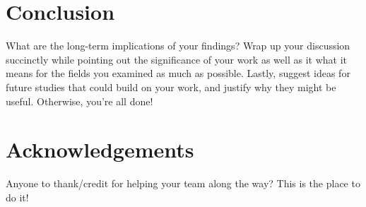 \documentclass[10pt,twocolumn,letterpaper]{article}
\begin{document}
\section{Conclusion}
What are the long-term implications of your findings? Wrap up your discussion succinctly while pointing out the significance of your work as well as it what it means for the fields you examined as much as possible. Lastly, suggest ideas for future studies that could build on your work, and justify why they might be useful. Otherwise, you're all done!

\section*{Acknowledgements}
Anyone to thank/credit for helping your team along the way? This is the place to do it!


\end{document}
